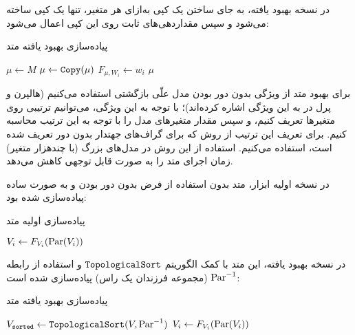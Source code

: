 در نسخه بهبود یافته،
به جای ساختن یک کپی به‌ازای هر متغیر،
تنها یک کپی ساخته می‌شود و سپس مقداردهی‌های ثابت
روی این کپی اعمال می‌شود:

\begin{algorithm}
  \caption{پیاده‌سازی بهبود یافته متد
  }
  \begin{latin}
  \begin{algorithmic}[1]
    \State $\mu \gets M$
    \State $\mu \gets \operatorname{\texttt{Copy}}(\mu)$ 
      \State $F_{\mu,W_i} \gets w_i$
    \EndFor
    \State \Return $\mu$
  \end{algorithmic}
  \end{latin}
\end{algorithm}

برای بهبود متد
از ویژگی بدون دور بودن مدل علّی بازگشتی استفاده می‌کنیم
(هالپرن و پرل در
\cite{halpern2001causes}
به این ویژگی اشاره کرده‌اند)؛
با توجه به این ویژگی، می‌توانیم ترتیبی روی متغیرها
تعریف کنیم، و سپس مقدار متغیرهای مدل را
با توجه به این ترتیب محاسبه کنیم.
برای تعریف این ترتیب از روش
که برای گراف‌های جهتدار بدون دور تعریف شده است، استفاده می‌کنیم.
استفاده از این روش در مدل‌های بزرگ
(با چندهزار متغیر)
زمان اجرای متد
را به صورت قابل توجهی کاهش می‌دهد.

در نسخه اولیه ابزار، متد
بدون استفاده از فرض بدون دور بودن
و به صورت ساده پیاده‌سازی شده بود:

\begin{algorithm}
  \caption{پیاده‌سازی اولیه متد
  }
  \begin{latin}
  \begin{algorithmic}[1]
        \State $V_i \gets F_{V_i}(\operatorname{Par}(V_i))$
      \EndFor
    \EndFor
  \end{algorithmic}
  \end{latin}
\end{algorithm}

در نسخه بهبود یافته، این متد با کمک الگوریتم
$\operatorname{\texttt{TopologicalSort}}$
و استفاده از رابطه
$\operatorname{Par}^{-1}$
(مجموعه فرزندان یک راس)
پیاده‌سازی شده است:

\begin{algorithm}
  \caption{پیاده‌سازی بهبود یافته متد
  }
  \begin{latin}
  \begin{algorithmic}[1]
    \State $V_{\texttt{sorted}} \gets \operatorname{\texttt{TopologicalSort}}(V, \operatorname{Par}^{-1})$
      \State $V_i \gets F_{V_i}(\operatorname{Par}(V_i))$
    \EndFor
  \end{algorithmic}
  \end{latin}
\end{algorithm}


